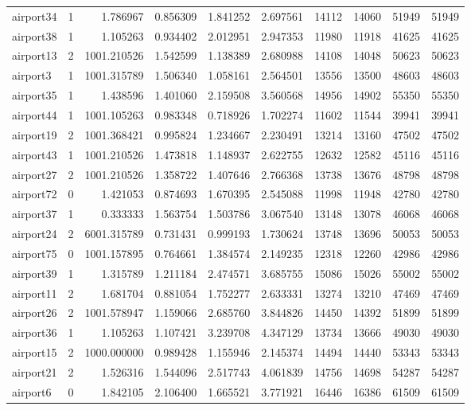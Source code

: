 \begin{longtable}{|l|r|r|r|r|r|r|r|r|r|}
airport34 & 1 & 1.786967 & 0.856309 & 1.841252 & 2.697561 & 14112 & 14060 & 51949 & 51949 \\
airport38 & 1 & 1.105263 & 0.934402 & 2.012951 & 2.947353 & 11980 & 11918 & 41625 & 41625 \\
airport13 & 2 & 1001.210526 & 1.542599 & 1.138389 & 2.680988 & 14108 & 14048 & 50623 & 50623 \\
airport3 & 1 & 1001.315789 & 1.506340 & 1.058161 & 2.564501 & 13556 & 13500 & 48603 & 48603 \\
airport35 & 1 & 1.438596 & 1.401060 & 2.159508 & 3.560568 & 14956 & 14902 & 55350 & 55350 \\
airport44 & 1 & 1001.105263 & 0.983348 & 0.718926 & 1.702274 & 11602 & 11544 & 39941 & 39941 \\
airport19 & 2 & 1001.368421 & 0.995824 & 1.234667 & 2.230491 & 13214 & 13160 & 47502 & 47502 \\
airport43 & 1 & 1001.210526 & 1.473818 & 1.148937 & 2.622755 & 12632 & 12582 & 45116 & 45116 \\
airport27 & 2 & 1001.210526 & 1.358722 & 1.407646 & 2.766368 & 13738 & 13676 & 48798 & 48798 \\
airport72 & 0 & 1.421053 & 0.874693 & 1.670395 & 2.545088 & 11998 & 11948 & 42780 & 42780 \\
airport37 & 1 & 0.333333 & 1.563754 & 1.503786 & 3.067540 & 13148 & 13078 & 46068 & 46068 \\
airport24 & 2 & 6001.315789 & 0.731431 & 0.999193 & 1.730624 & 13748 & 13696 & 50053 & 50053 \\
airport75 & 0 & 1001.157895 & 0.764661 & 1.384574 & 2.149235 & 12318 & 12260 & 42986 & 42986 \\
airport39 & 1 & 1.315789 & 1.211184 & 2.474571 & 3.685755 & 15086 & 15026 & 55002 & 55002 \\
airport11 & 2 & 1.681704 & 0.881054 & 1.752277 & 2.633331 & 13274 & 13210 & 47469 & 47469 \\
airport26 & 2 & 1001.578947 & 1.159066 & 2.685760 & 3.844826 & 14450 & 14392 & 51899 & 51899 \\
airport36 & 1 & 1.105263 & 1.107421 & 3.239708 & 4.347129 & 13734 & 13666 & 49030 & 49030 \\
airport15 & 2 & 1000.000000 & 0.989428 & 1.155946 & 2.145374 & 14494 & 14440 & 53343 & 53343 \\
airport21 & 2 & 1.526316 & 1.544096 & 2.517743 & 4.061839 & 14756 & 14698 & 54287 & 54287 \\
airport6 & 0 & 1.842105 & 2.106400 & 1.665521 & 3.771921 & 16446 & 16386 & 61509 & 61509 \\

\end{longtable}
